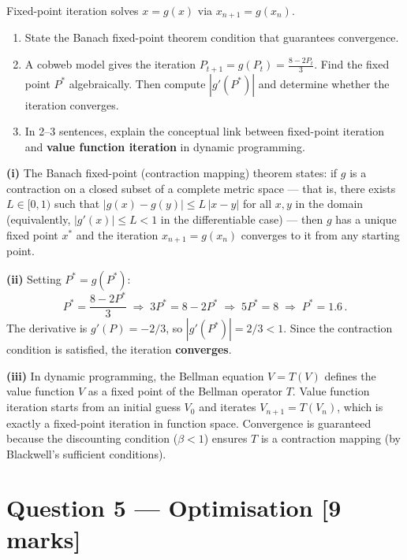 \documentclass[11pt,a4paper]{article}
\begin{document}
Fixed-point iteration solves $x = g(x)$ via $x_{n+1} = g(x_n)$.

\begin{enumerate}[label=(\roman*),nosep]
\item State the Banach fixed-point theorem condition that guarantees convergence.
\item A cobweb model gives the iteration $P_{t+1} = g(P_t) = \tfrac{8 - 2P_t}{3}$.  Find the fixed point $P^*$ algebraically.  Then compute $|g'(P^*)|$ and determine whether the iteration converges.
\item In 2--3 sentences, explain the conceptual link between fixed-point iteration and \textbf{value function iteration} in dynamic programming.
\end{enumerate}

\begin{solution}
\textbf{(i)} The Banach fixed-point (contraction mapping) theorem states: if $g$ is a contraction on a closed subset of a complete metric space --- that is, there exists $L\in[0,1)$ such that $|g(x)-g(y)| \le L\,|x-y|$ for all $x,y$ in the domain (equivalently, $|g'(x)| \le L < 1$ in the differentiable case) --- then $g$ has a unique fixed point $x^*$ and the iteration $x_{n+1}=g(x_n)$ converges to it from any starting point.

\medskip

\textbf{(ii)} Setting $P^* = g(P^*)$:
\[
P^* = \frac{8-2P^*}{3} \;\Longrightarrow\; 3P^* = 8-2P^* \;\Longrightarrow\; 5P^*=8 \;\Longrightarrow\; \boxed{P^* = 1.6}\,.
\]
The derivative is $g'(P) = -2/3$, so $|g'(P^*)| = 2/3 < 1$.  Since the contraction condition is satisfied, the iteration \textbf{converges}.

\medskip

\textbf{(iii)} In dynamic programming, the Bellman equation $V = T(V)$ defines the value function $V$ as a fixed point of the Bellman operator $T$.  Value function iteration starts from an initial guess $V_0$ and iterates $V_{n+1} = T(V_n)$, which is exactly a fixed-point iteration in function space.  Convergence is guaranteed because the discounting condition ($\beta < 1$) ensures $T$ is a contraction mapping (by Blackwell's sufficient conditions).
\end{solution}


\newpage

\section*{Question 5 --- Optimisation \hfill [9 marks]}
\end{document}
